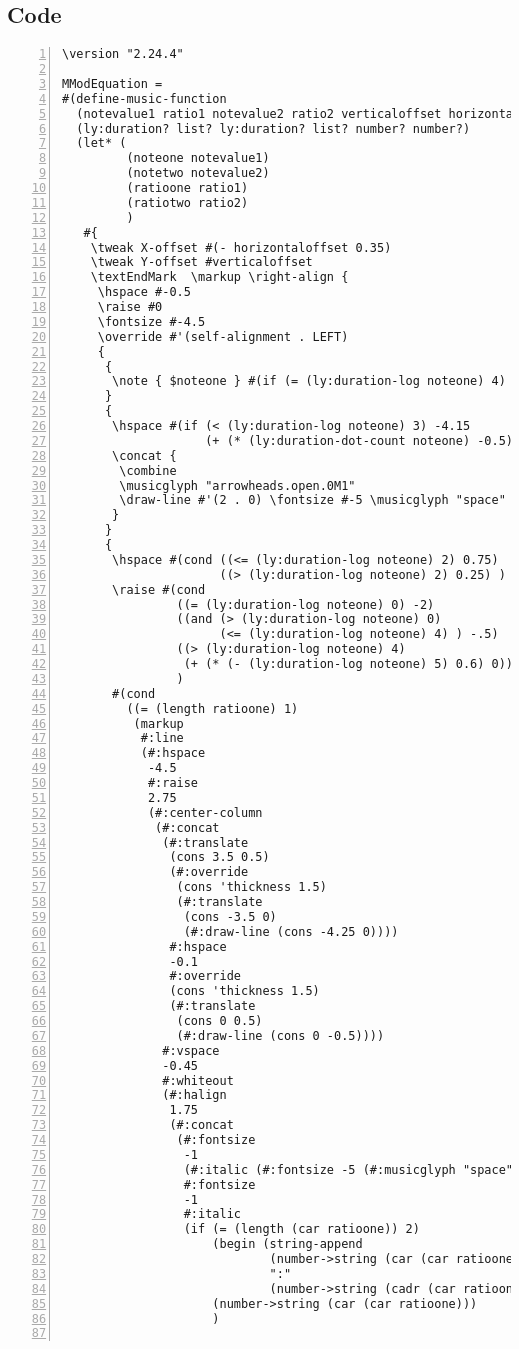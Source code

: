 \begin{enumerate}
\end{enumerate}

\subsection{Code}
\begin{Verbatim}[numbers=left,xleftmargin=5mm]
\version "2.24.4"

MModEquation =
#(define-music-function
  (notevalue1 ratio1 notevalue2 ratio2 verticaloffset horizontaloffset)
  (ly:duration? list? ly:duration? list? number? number?)
  (let* (
         (noteone notevalue1)
         (notetwo notevalue2)
         (ratioone ratio1)
         (ratiotwo ratio2)
         )
   #{
    \tweak X-offset #(- horizontaloffset 0.35)
    \tweak Y-offset #verticaloffset
    \textEndMark  \markup \right-align {
     \hspace #-0.5
     \raise #0
     \fontsize #-4.5
     \override #'(self-alignment . LEFT)
     {
      {
       \note { $noteone } #(if (= (ly:duration-log noteone) 4) 1 1 )
      }
      {
       \hspace #(if (< (ly:duration-log noteone) 3) -4.15
                    (+ (* (ly:duration-dot-count noteone) -0.5) -4.5))
       \concat {
        \combine
        \musicglyph "arrowheads.open.0M1"
        \draw-line #'(2 . 0) \fontsize #-5 \musicglyph "space"
       }
      }
      {
       \hspace #(cond ((<= (ly:duration-log noteone) 2) 0.75)
                      ((> (ly:duration-log noteone) 2) 0.25) )
       \raise #(cond
                ((= (ly:duration-log noteone) 0) -2)
                ((and (> (ly:duration-log noteone) 0)
                      (<= (ly:duration-log noteone) 4) ) -.5)
                ((> (ly:duration-log noteone) 4)
                 (+ (* (- (ly:duration-log noteone) 5) 0.6) 0))
                )
       #(cond
         ((= (length ratioone) 1)
          (markup
           #:line
           (#:hspace
            -4.5
            #:raise
            2.75
            (#:center-column
             (#:concat
              (#:translate
               (cons 3.5 0.5)
               (#:override
                (cons 'thickness 1.5)
                (#:translate
                 (cons -3.5 0)
                 (#:draw-line (cons -4.25 0))))
               #:hspace
               -0.1
               #:override
               (cons 'thickness 1.5)
               (#:translate
                (cons 0 0.5)
                (#:draw-line (cons 0 -0.5))))
              #:vspace
              -0.45
              #:whiteout
              (#:halign
               1.75
               (#:concat
                (#:fontsize
                 -1
                 (#:italic (#:fontsize -5 (#:musicglyph "space")))
                 #:fontsize
                 -1
                 #:italic
                 (if (= (length (car ratioone)) 2)
                     (begin (string-append
                             (number->string (car (car ratioone)))
                             ":"
                             (number->string (cadr (car ratioone))))  )
                     (number->string (car (car ratioone)))
                     )


\end{Verbatim}
